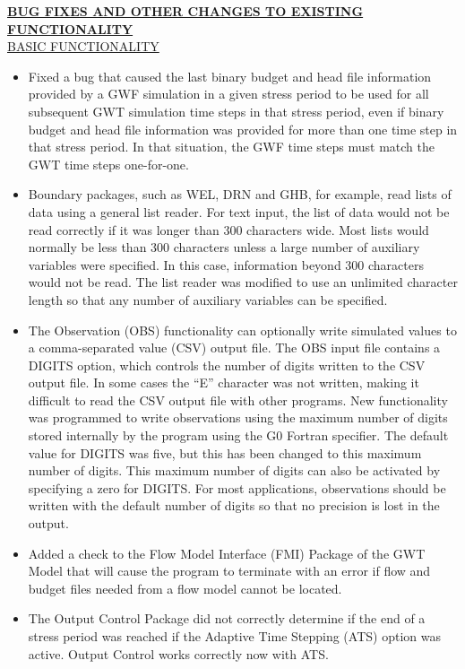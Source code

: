 \documentclass[11pt,twoside,twocolumn]{usgsreport}
\begin{document}
\begin{itemize}
	\textbf{\underline{BUG FIXES AND OTHER CHANGES TO EXISTING FUNCTIONALITY}} \\
	\underline{BASIC FUNCTIONALITY}
	\begin{itemize}
	        \item Fixed a bug that caused the last binary budget and head file information provided by a GWF simulation in a given stress period to be used for all subsequent GWT simulation time steps in that stress period, even if binary budget and head file information was provided for more than one time step in that stress period. In that situation, the GWF time steps must match the GWT time steps one-for-one.
	        \item Boundary packages, such as WEL, DRN and GHB, for example, read lists of data using a general list reader.  For text input, the list of data would not be read correctly if it was longer than 300 characters wide.  Most lists would normally be less than 300 characters unless a large number of auxiliary variables were specified.  In this case, information beyond 300 characters would not be read.  The list reader was modified to use an unlimited character length so that any number of auxiliary variables can be specified.
	        \item The Observation (OBS) functionality can optionally write simulated values to a comma-separated value (CSV) output file.  The OBS input file contains a DIGITS option, which controls the number of digits written to the CSV output file.  In some cases the ``E'' character was not written, making it difficult to read the CSV output file with other programs.  New functionality was programmed to write observations using the maximum number of digits stored internally by the program using the G0 Fortran specifier.  The default value for DIGITS was five, but this has been changed to this maximum number of digits.  This maximum number of digits can also be activated by specifying a zero for DIGITS.  For most applications, observations should be written with the default number of digits so that no precision is lost in the output.
	        \item Added a check to the Flow Model Interface (FMI) Package of the GWT Model that will cause the program to terminate with an error if flow and budget files needed from a flow model cannot be located.
	        \item The Output Control Package did not correctly determine if the end of a stress period was reached if the Adaptive Time Stepping (ATS) option was active.  Output Control works correctly now with ATS.

\end{itemize}
\end{itemize}
\end{document}
